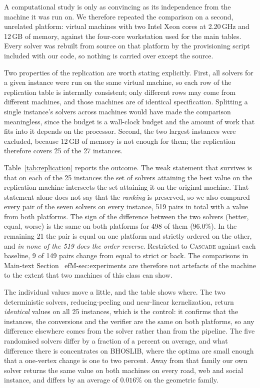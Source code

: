 \documentclass[preprint,authoryear,11pt]{elsarticle}
\theoremstyle{definition}
\begin{document}
A computational study is only as convincing as its independence from the machine
it was run on. We therefore repeated the comparison on a second, unrelated
platform: virtual machines with two Intel Xeon cores at 2.20\,GHz and 12\,GB of
memory, against the four-core workstation used for the main tables. Every solver
was rebuilt from source on that platform by the provisioning script included
with our code, so nothing is carried over except the source.

Two properties of the replication are worth stating explicitly. First, all
solvers for a given instance were run on the same virtual machine, so each row
of the replication table is internally consistent; only different rows may come
from different machines, and those machines are of identical specification.
Splitting a single instance's solvers across machines would have made the
comparison meaningless, since the budget is a wall-clock budget and the amount
of work that fits into it depends on the processor. Second, the two largest
instances were excluded, because 12\,GB of memory is not enough for them; the
replication therefore covers 25 of the 27 instances.

Table~\ref{tab:replication} reports the outcome. The weak statement that
survives is that on each of the 25 instances the set of solvers attaining the
best value on the replication machine intersects the set attaining it on the
original machine. That statement alone does not say that the \emph{ranking} is
preserved, so we also compared every pair of the seven solvers on every
instance, 519 pairs in total with a value from both platforms. The sign of the
difference between the two solvers (better, equal, worse) is the same on both
platforms for 498 of them ($96.0\%$). In the remaining 21 the pair is equal on
one platform and strictly ordered on the other, and \emph{in none of the 519 does
the order reverse}. Restricted to \textsc{Cascade} against each baseline, 9 of
149 pairs change from equal to strict or back. The comparisons in
Main-text Section~
ef{M-sec:experiments} are therefore not artefacts of the machine to the
extent that two machines of this class can show.

The individual values move a little, and the table shows where. The two
deterministic solvers, reducing-peeling and near-linear kernelization, return
\emph{identical} values on all 25 instances, which is the control: it confirms that
the instances, the conversions and the verifier are the same on both platforms,
so any difference elsewhere comes from the solver rather than from the pipeline.
The five randomised solvers differ by a fraction of a percent on average, and
what difference there is concentrates on BHOSLIB, where the optima are small
enough that a one-vertex change is one to two percent. Away from that family our
own solver returns the same value on both machines on every road, web and social
instance, and differs by an average of $0.016\%$ on the geometric family.
\end{document}
